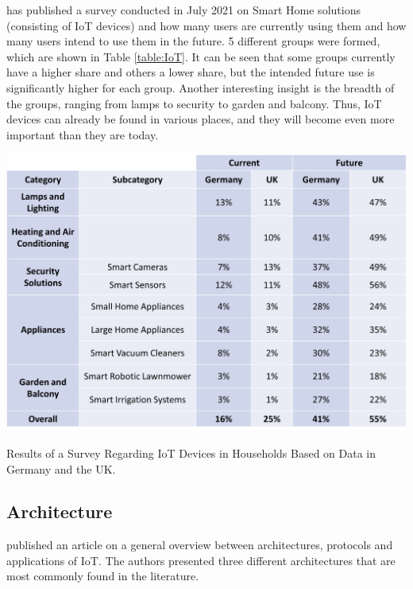 \cite{website:gfuSurvery} has published a survey conducted in July 2021 on Smart Home solutions (consisting of IoT devices) and how many users are currently using them and how many users intend to use them in the future. 5 different groups were formed, which are shown in Table \ref{table:IoT}. It can be seen that some groups currently have a higher share and others a lower share, but the intended future use is significantly higher for each group. Another interesting insight is the breadth of the groups, ranging from lamps to security to garden and balcony. Thus, IoT devices can already be found in various places, and they will become even more important than they are today.  

\begin{table}[tph]
\includegraphics[scale=0.5]{assets/IoTTable.png}
\centering
\caption{Results of a Survey Regarding IoT Devices in Households Based on Data in Germany and the UK.}
    \label{table:IoT}
\end{table}



\subsection{Architecture}
\cite{article:Lombardi2021} published an article on a general overview between architectures, protocols and applications of IoT. The authors presented three different architectures that are most commonly found in the literature. 

